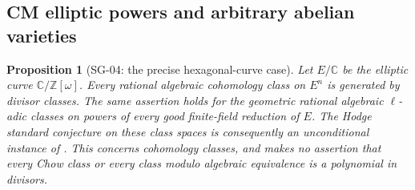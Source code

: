 \documentclass[11pt,a4paper]{article}
\newtheorem{proposition}[theorem]{Proposition}
\theoremstyle{remark}
\begin{document}
\subsection{CM elliptic powers and arbitrary abelian varieties}

\begin{proposition}[SG-04: the precise hexagonal-curve case]
Let $E/\mathbb C$ be the elliptic curve $\mathbb C/\mathbb Z[\omega]$. Every rational algebraic cohomology class on $E^n$ is generated by divisor classes. The same assertion holds for the geometric rational algebraic $\ell$-adic classes on powers of every good finite-field reduction of $E$. The Hodge standard conjecture on these class spaces is consequently an unconditional instance of \cite[Remarks~3.7--3.8]{MilnePolarizations}. This concerns cohomology classes, and makes no assertion that every Chow class or every class modulo algebraic equivalence is a polynomial in divisors.
\end{proposition}
\end{document}
